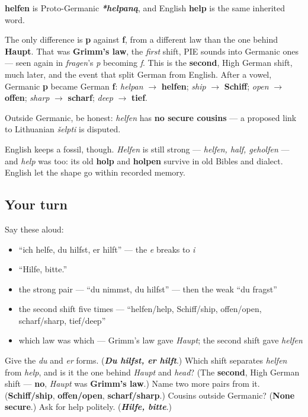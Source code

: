 \begin{cousinweb}
\textbf{helfen} is Proto-Germanic \emph{\textbf{*helpaną}}, and English \textbf{help} is the same inherited word.

The only difference is \textbf{p} against \textbf{f}, from a different law than the one behind \textbf{Haupt}. That was \textbf{Grimm's law}, the \emph{first} shift, PIE sounds into Germanic ones — seen again in \emph{fragen}'s \emph{p} becoming \emph{f}. This is the \textbf{second}, High German shift, much later, and the event that split German from English. After a vowel, Germanic \textbf{p} became German \textbf{f}: \emph{helpan} $\to$ \textbf{helfen}; \emph{ship} $\to$ \textbf{Schiff}; \emph{open} $\to$ \textbf{offen}; \emph{sharp} $\to$ \textbf{scharf}; \emph{deep} $\to$ \textbf{tief}.

Outside Germanic, be honest: \emph{helfen} has \textbf{no secure cousins} — a proposed link to Lithuanian \emph{šelpti} is disputed.

English keeps a fossil, though. \emph{Helfen} is still strong — \emph{helfen, half, geholfen} — and \emph{help} was too: its old \textbf{holp} and \textbf{holpen} survive in old Bibles and dialect. English let the shape go within recorded memory.
\end{cousinweb}

\subsection*{Your turn}
Say these aloud:

\begin{itemize}
\raggedright
  \item \textquotedblleft{}ich helfe, du hilfst, er hilft\textquotedblright{} — the \emph{e} breaks to \emph{i}
  \item \textquotedblleft{}Hilfe, bitte.\textquotedblright{}
  \item the strong pair — \textquotedblleft{}du nimmst, du hilfst\textquotedblright{} — then the weak \textquotedblleft{}du fragst\textquotedblright{}
  \item the second shift five times — \textquotedblleft{}helfen/help, Schiff/ship, offen/open, scharf/sharp, tief/deep\textquotedblright{}
  \item which law was which — Grimm's law gave \emph{Haupt}; the second shift gave \emph{helfen}
\end{itemize}

\begin{tcolorbox}[breakable,colback=teal!4,colframe=teal!35!black,title={Before you move on}]
Give the \emph{du} and \emph{er} forms. (\emph{\textbf{Du hilfst, er hilft}}.) Which shift separates \emph{helfen} from \emph{help}, and is it the one behind \emph{Haupt} and \emph{head}? (The \textbf{second}, High German shift — \textbf{no}, \emph{Haupt} was \textbf{Grimm's law}.) Name two more pairs from it. (\textbf{Schiff/ship}, \textbf{offen/open}, \textbf{scharf/sharp}.) Cousins outside Germanic? (\textbf{None secure}.) Ask for help politely. (\emph{\textbf{Hilfe, bitte}}.)
\end{tcolorbox}
